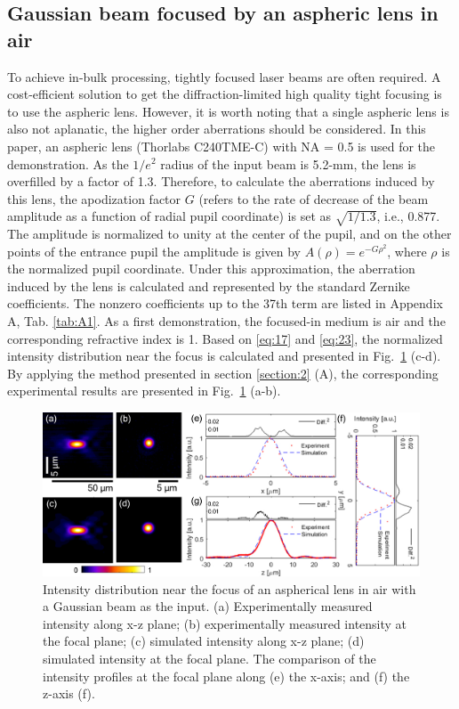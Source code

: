 \documentclass[9pt,twocolumn,twoside]{osajnl}
\begin{document}
\subsection{Gaussian beam focused by an aspheric lens in air}
To achieve in-bulk processing, tightly focused laser beams are often required. A cost-efficient solution to get the diffraction-limited high quality tight focusing is to use the aspheric lens. However, it is worth noting that a single aspheric lens is also not aplanatic, the higher order aberrations should be considered.
In this paper, an aspheric lens (Thorlabs C240TME-C) with NA = 0.5 is used for the demonstration. As the $1/e^2$ radius of the input beam is 5.2-mm, the lens is overfilled by a factor of 1.3. Therefore, to calculate the aberrations induced by this lens, the apodization factor $G$ (refers to the rate of decrease of the beam amplitude as a function of radial pupil coordinate) is set as $\sqrt{1/1.3}$, i.e., 0.877. The amplitude is normalized to unity at the center of the pupil, and on the other points of the entrance pupil the amplitude is given by $A(\rho)=e^{-G\rho^2}$, where $\rho$ is the normalized pupil coordinate. Under this approximation, the aberration induced by the lens is calculated and represented by the standard Zernike coefficients. The nonzero coefficients up to the 37th term are listed in Appendix A, Tab. \ref{tab:A1}. As a first demonstration, the focused-in medium is air and the corresponding refractive index is 1. Based on \eqref{eq:17} and \eqref{eq:23}, the normalized intensity distribution near the focus is calculated and presented in Fig.~\ref{fig:3b} (c-d). By applying the method presented in section \ref{section:2} (A), the corresponding experimental results are presented in Fig.~\ref{fig:3b} (a-b).  
\begin{figure}
	\centering
	\includegraphics[width=\linewidth]{../AppOptics/figures/C240TME-C.pdf}
	\caption{Intensity distribution near the focus of an aspherical lens in air with a Gaussian beam as the input. (a) Experimentally measured intensity along x-z plane; (b) experimentally measured intensity at the focal plane; (c) simulated intensity along x-z plane; (d) simulated intensity at the focal plane. The comparison of the intensity profiles at the focal plane along (e) the x-axis; and (f) the z-axis (f).}\label{fig:3b}
\end{figure}
\end{document}
